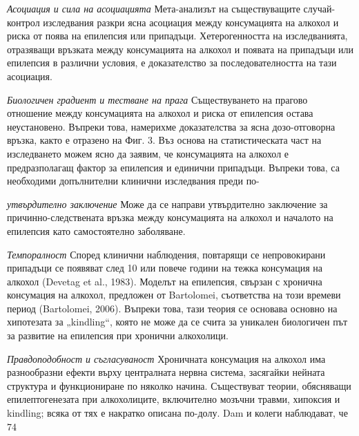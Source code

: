 \documentclass{article}
\begin{document}
\textit{Асоциация и сила на асоциацията}
Мета-анализът на съществуващите случай-контрол изследвания
разкри ясна асоциация между консумацията на алкохол
и риска от поява на епилепсия или припадъци. Хетерогенността
на изследванията, отразяващи връзката между консумацията на алкохол и появата на припадъци или епилепсия в различни условия, е доказателство за последователността на тази асоциация.

\textit{Биологичен градиент и тестване на прага}
Съществуването на прагово отношение между консумацията на алкохол
и риска от епилепсия остава неустановено.
Въпреки това, намерихме доказателства за ясна дозо-отговорна връзка, както е отразено на Фиг. 3. Въз основа на статистическата част
на изследването можем ясно да заявим, че консумацията на алкохол е предразполагащ фактор за епилепсия и единични припадъци.
Въпреки това, са необходими допълнителни клинични изследвания преди по-


\textit{утвърдително заключение}
Може да се направи утвърдително заключение за причинно-следствената връзка между консумацията на алкохол и началото на епилепсия като самостоятелно заболяване.

\textit{Темпоралност}
Според клинични наблюдения, повтарящи се непровокирани припадъци се появяват след 10 или повече години на тежка консумация на алкохол (Devetag et al., 1983). Моделът на епилепсия, свързан с хронична консумация на алкохол, предложен от Bartolomei, съответства на този времеви период (Bartolomei, 2006). Въпреки това, тази теория се основава основно на хипотезата за „kindling“, която не може да се счита за уникален биологичен път за развитие на епилепсия при хронични алкохолици.

\textit{Правдоподобност и съгласуваност}
Хроничната консумация на алкохол има разнообразни ефекти върху централната нервна система, засягайки нейната структура и функциониране по няколко начина. Съществуват теории, обясняващи епилептогенезата при алкохолиците, включително мозъчни травми, хипоксия и kindling; всяка от тях е накратко описана по-долу. Dam и колеги наблюдават, че 74%
\end{document}
